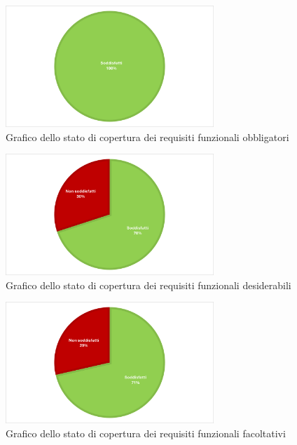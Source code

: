 \begin{figure}[H]
    \centering
    \includegraphics[width=0.7\textwidth]{images/stato_req_obbligatori.png}
    \caption{Grafico dello stato di copertura dei requisiti funzionali obbligatori}
\end{figure}

\begin{figure}[H]
    \centering
    \includegraphics[width=0.7\textwidth]{images/stato_req_desiderabili.png}
    \caption{Grafico dello stato di copertura dei requisiti funzionali desiderabili}
\end{figure}

\begin{figure}[H]
    \centering
    \includegraphics[width=0.7\textwidth]{images/stato_req_facolatativi.png}
    \caption{Grafico dello stato di copertura dei requisiti funzionali facoltativi}
\end{figure}


